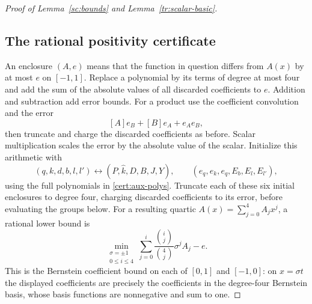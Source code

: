 \begin{proof}[Proof of Lemma~\ref{sc:bounds} and Lemma~\ref{tr:scalar-basic}]
\subsection*{The rational positivity certificate}
An enclosure $(A,e)$ means that the function in question differs from
$A(x)$ by at most $e$ on $[-1,1]$. Replace a polynomial by its terms of
degree at most four and add the sum of the absolute values of all discarded
coefficients to $e$. Addition and subtraction add error bounds. For a
product use the coefficient convolution and the error
\begin{equation}\label{cert:product-error}
 [A]e_B+[B]e_A+e_Ae_B,
\end{equation}
then truncate and charge the discarded coefficients as before. Scalar
multiplication scales the error by the absolute value of the scalar.
Initialize this arithmetic with
\[
 (q,k,d,b,l,l')\longleftrightarrow
 (P,\widehat k,D,B,J,Y),\qquad
 (e_q,e_k,e_q,E_b,E_l,E_{l'}),
\]
using the full polynomials in \eqref{cert:aux-polys}. Truncate each of
these six initial enclosures to degree four, charging discarded coefficients
to its error, before evaluating the groups below.
For a resulting quartic $A(x)=\sum_{j=0}^4A_jx^j$, a rational lower bound is
\begin{equation}\label{cert:Bernstein}
 \min_{\substack{\sigma=\pm1\\0\le i\le4}}
       \sum_{j=0}^i\frac{\binom ij}{\binom4j}\sigma^jA_j-e.
\end{equation}
This is the Bernstein coefficient bound on each of $[0,1]$ and $[-1,0]$:
on $x=\sigma t$ the displayed coefficients are precisely the coefficients
in the degree-four Bernstein basis, whose basis functions are nonnegative
and sum to one.


\end{proof}
